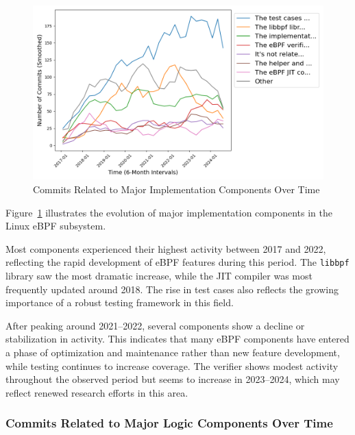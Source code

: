 \begin{figure}[ht]
    \centering
    \includegraphics[width=\linewidth]{feature-analysis/timeline_major_related_implementation_component_smoothed.png}
    \caption{Commits Related to Major Implementation Components Over Time}
    \label{fig:timeline_major_related_implementation_component_smoothed}
\end{figure}

Figure~\ref{fig:timeline_major_related_implementation_component_smoothed} illustrates the evolution of major implementation components in the Linux eBPF subsystem.

Most components experienced their highest activity between 2017 and 2022, reflecting the rapid development of eBPF features during this period. The \texttt{libbpf} library saw the most dramatic increase, while the JIT compiler was most frequently updated around 2018. The rise in test cases also reflects the growing importance of a robust testing framework in this field.

After peaking around 2021--2022, several components show a decline or stabilization in activity. This indicates that many eBPF components have entered a phase of optimization and maintenance rather than new feature development, while testing continues to increase coverage. The verifier shows modest activity throughout the observed period but seems to increase in 2023--2024, which may reflect renewed research efforts in this area.

\subsubsection{Commits Related to Major Logic Components Over Time}


